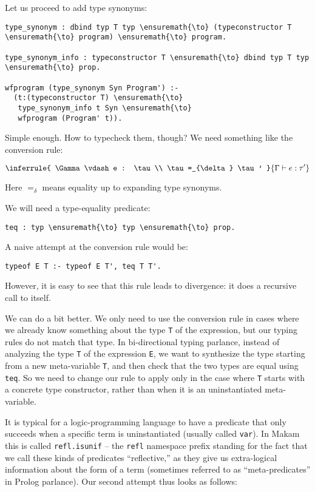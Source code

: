 Let us proceed to add type synonyms:

\begin{verbatim}
type_synonym : dbind typ T typ \ensuremath{\to} (typeconstructor T \ensuremath{\to} program) \ensuremath{\to} program.

type_synonym_info : typeconstructor T \ensuremath{\to} dbind typ T typ \ensuremath{\to} prop.

wfprogram (type_synonym Syn Program') :-
  (t:(typeconstructor T) \ensuremath{\to}
   type_synonym_info t Syn \ensuremath{\to}
   wfprogram (Program' t)).
\end{verbatim}

Simple enough. How to typecheck them, though? We need something like the
conversion rule:

\begin{displaymath}
\inferrule{
  \Gamma \vdash e : \tau \\ \tau =_{\delta} \tau'
}{
  \Gamma \vdash e : \tau'
}
\end{displaymath}

Here \(=_{\delta}\) means equality up to expanding type synonyms.

We will need a type-equality predicate:

\begin{verbatim}
teq : typ \ensuremath{\to} typ \ensuremath{\to} prop.
\end{verbatim}

A naive attempt at the conversion rule would be:

\begin{verbatim}
typeof E T :- typeof E T', teq T T'.
\end{verbatim}

However, it is easy to see that this rule leads to divergence: it does a
recursive call to itself.

We can do a bit better. We only need to use the conversion rule in cases
where we already know something about the type \texttt{T} of the
expression, but our typing rules do not match that type. In
bi-directional typing parlance, instead of analyzing the type \texttt{T}
of the expression \texttt{E}, we want to synthesize the type starting
from a new meta-variable \texttt{T\textquotesingle{}}, and then check
that the two types are equal using \texttt{teq}. So we need to change
our rule to apply only in the case where \texttt{T} starts with a
concrete type constructor, rather than when it is an uninstantiated
meta-variable.

It is typical for a logic-programming language to have a predicate that
only succeeds when a specific term is uninstantiated (usually called
\texttt{var}). In Makam this is called \texttt{refl.isunif} -- the
\texttt{refl} namespace prefix standing for the fact that we call these
kinds of predicates ``reflective,'' as they give us extra-logical
information about the form of a term (sometimes referred to as
``meta-predicates'' in Prolog parlance). Our second attempt thus looks
as follows:

